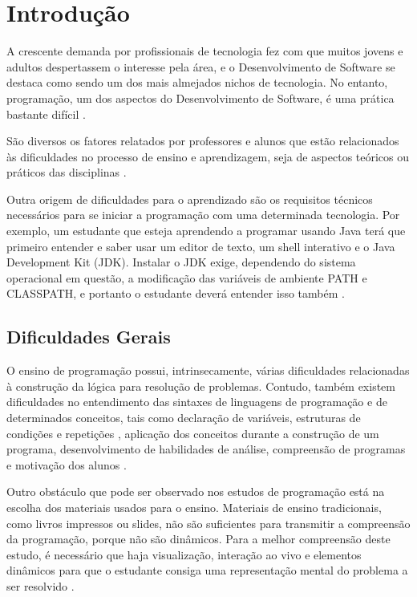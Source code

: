 \chapter*[Introdução]{Introdução}

A crescente demanda por profissionais de tecnologia fez com que muitos jovens e adultos despertassem o interesse pela área, e o Desenvolvimento de Software se destaca como sendo um dos mais almejados nichos de
tecnologia. No entanto, programação, um dos aspectos do Desenvolvimento de Software, é uma prática bastante difícil \cite{robins2003}.

São diversos os fatores relatados por professores e alunos que estão relacionados às dificuldades no processo de ensino e aprendizagem, seja de aspectos teóricos ou práticos das disciplinas \cite{marcolino2015}.%

Outra origem de dificuldades para o aprendizado são os requisitos técnicos necessários para se iniciar a programação com uma determinada tecnologia. Por exemplo, um estudante que esteja aprendendo a programar usando Java terá que primeiro entender e saber usar um editor de texto, um shell interativo e o Java Development Kit (JDK). Instalar o JDK exige, dependendo do sistema operacional em questão, a modificação das variáveis de ambiente PATH e CLASSPATH, e portanto o estudante deverá entender isso também \cite{truong2003}.


\section{Dificuldades Gerais}
	
O ensino de programação possui, intrinsecamente, várias dificuldades relacionadas à construção da lógica para resolução de problemas. Contudo, também existem dificuldades no entendimento das sintaxes de linguagens de programação e de determinados conceitos, tais como declaração de variáveis, estruturas de condições e repetições \cite{helminen2010}, aplicação dos conceitos durante a construção de um programa, desenvolvimento de habilidades de análise, compreensão de programas e motivação dos alunos \cite{robins2010}.

Outro obstáculo que pode ser observado nos estudos de programação está na escolha dos materiais usados para o ensino. Materiais de ensino tradicionais, como livros impressos ou slides, não são suficientes para transmitir a compreensão da programação, porque não são dinâmicos. Para a melhor compreensão deste estudo, é necessário que haja visualização, interação ao vivo e elementos dinâmicos para que o estudante consiga uma representação mental do problema a ser resolvido \cite{gomesmendes2007, cheah2020}.

